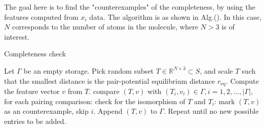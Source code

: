 \documentclass[12pt]{article}
\begin{document}
The goal here is to find the "counterexamples" of the completeness, by using the features computed from $x_i$ data. 
The algorithm is as shown in Alg.(). In this case, $N$ corresponds to the number of atoms in the molecule, where $N > 3$ is of interest.


\begin{algorithm}
    \caption{Completeness check}
    \label{alg:completeness_check}
    \begin{algorithmic}[1] 
            \State Let $\Gamma$ be an empty storage.
            \State Pick random subset $T \in \mathbb{R}^{N \times 3} \subset S$, 
            and scale $T$ such that the smallest distance is the pair-potential equilibrium distance $r_\text{eq}$.
            \State Compute the feature vector $v$ from $T$.
            \If{$\Gamma \neq \emptyset$}
                \State compare $(T,v)$ with $(T_i, v_i) \in \Gamma, i = 1,2,...,|\Gamma|$, 
                for each pairing comparison: 
                    \State check for the isomorphism of $T$ and $T_i$:
                        \State mark $(T, v)$ as an counterexample,
                        \State skip $i$.
                    \EndIf
                \EndIf
            \EndIf
            \State Append $(T,v)$ to $\Gamma$.
            \State Repeat until no new possible entries to be added. 
        \EndFor
    \end{algorithmic}
\end{algorithm}
\end{document}
